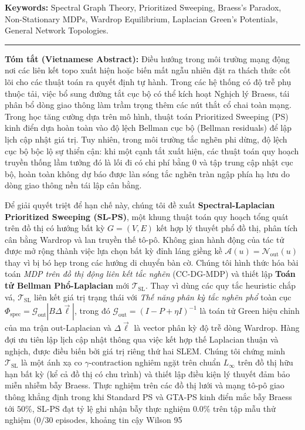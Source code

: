 \documentclass[11pt,a4paper]{article}
\begin{document}
\vspace{0.5em}
\noindent\textbf{Keywords:} Spectral Graph Theory, Prioritized Sweeping, Braess's Paradox, Non-Stationary MDPs, Wardrop Equilibrium, Laplacian Green's Potentials, General Network Topologies.

\vspace{1em}
\begin{center}
\rule{0.8\textwidth}{0.4pt}
\end{center}
\vspace{0.5em}

\noindent\textbf{Tóm tắt (Vietnamese Abstract):}
Điều hướng trong môi trường mạng động nơi các liên kết topo xuất hiện hoặc biến mất ngẫu nhiên đặt ra thách thức cốt lõi cho các thuật toán ra quyết định tự hành. Trong các hệ thống có độ trễ phụ thuộc tải, việc bổ sung đường tắt cục bộ có thể kích hoạt Nghịch lý Braess, tái phân bổ dòng giao thông làm trầm trọng thêm các nút thắt cổ chai toàn mạng. Trong học tăng cường dựa trên mô hình, thuật toán Prioritized Sweeping (PS) kinh điển dựa hoàn toàn vào độ lệch Bellman cục bộ (Bellman residuals) để lập lịch cập nhật giá trị. Tuy nhiên, trong môi trường tắc nghẽn phi dừng, độ lệch cục bộ bộc lộ sự thiển cận: khi một cạnh tắt xuất hiện, các thuật toán quy hoạch truyền thống lầm tưởng đó là lối đi có chi phí bằng 0 và tập trung cập nhật cục bộ, hoàn toàn không dự báo được làn sóng tắc nghẽn tràn ngập phía hạ lưu do dòng giao thông nền tái lập cân bằng.

Để giải quyết triệt để hạn chế này, chúng tôi đề xuất \textbf{Spectral-Laplacian Prioritized Sweeping (SL-PS)}, một khung thuật toán quy hoạch tổng quát trên đồ thị có hướng bất kỳ $G = (V, E)$ kết hợp lý thuyết phổ đồ thị, phân tích cân bằng Wardrop và lan truyền thế tô-pô. Không gian hành động của tác tử được mở rộng thành việc lựa chọn bất kỳ đỉnh láng giềng kề $\mathcal{A}(u) = \mathcal{N}_{\text{out}}(u)$ thay vì bị bó hẹp trong các hướng di chuyển bàn cờ. Chúng tôi hình thức hóa bài toán \textit{MDP trên đồ thị động liên kết tắc nghẽn} (CC-DG-MDP) và thiết lập \textbf{Toán tử Bellman Phổ-Laplacian} mới $\mathcal{T}_{\text{SL}}$. Thay vì dùng các quy tắc heuristic chắp vá, $\mathcal{T}_{\text{SL}}$ liên kết giá trị trạng thái với \textit{Thế năng phân kỳ tắc nghẽn phổ} toàn cục $\Phi_{\text{spec}} = \mathcal{G}_{\text{out}} |B \Delta \vec{\ell}|$, trong đó $\mathcal{G}_{\text{out}} = (I - P + \eta I)^{-1}$ là toán tử Green hiệu chỉnh của ma trận out-Laplacian và $\Delta \vec{\ell}$ là vector phân kỳ độ trễ dòng Wardrop. Hàng đợi ưu tiên lập lịch cập nhật thông qua việc kết hợp thế Laplacian thuận và nghịch, được điều biến bởi giá trị riêng thứ hai SLEM. Chúng tôi chứng minh $\mathcal{T}_{\text{SL}}$ là một ánh xạ co $\gamma$-contraction nghiêm ngặt trên chuẩn $L_\infty$ trên đồ thị hữu hạn bất kỳ (kể cả đồ thị có chu trình) và thiết lập điều kiện lý thuyết đảm bảo miễn nhiễm bẫy Braess. Thực nghiệm trên các đồ thị lưới và mạng tô-pô giao thông khẳng định trong khi Standard PS và GTA-PS kinh điển mắc bẫy Braess tới $50\%$, SL-PS đạt tỷ lệ ghi nhận bẫy thực nghiệm $0.0\%$ trên tập mẫu thử nghiệm ($0/30$ episodes, khoảng tin cậy Wilson 95%
\end{document}
